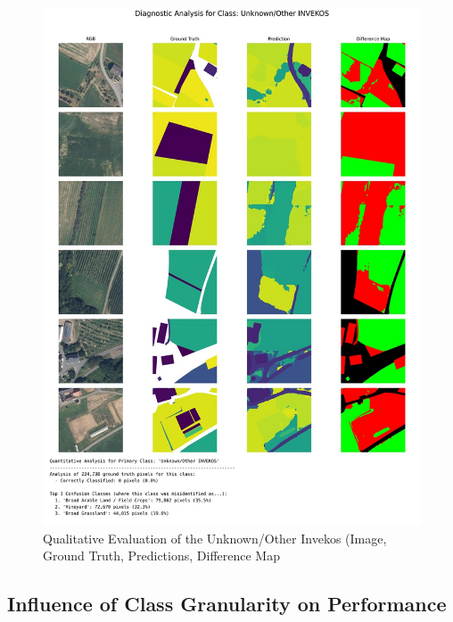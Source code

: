 \documentclass{report}
\begin{document}
\begin{figure}[H]
    \centering
    \includegraphics[width=1.2\linewidth]{own_images/low_res_greater_100_sqm_diagnostic_0_Unknown_Other INVEKOS.jpg}
    \caption{Qualitative Evaluation of the Unknown/Other Invekos (Image, Ground Truth, Predictions, Difference Map}
    \label{fig:qual_eval_unknown_other_invekos}
\end{figure}





\subsection{Influence of Class Granularity on Performance}
\end{document}
